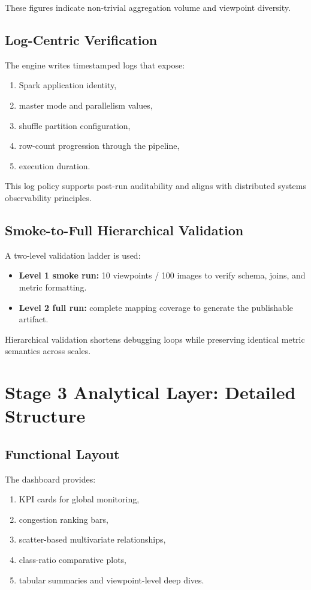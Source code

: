 \documentclass[journal,onecolumn]{IEEEtran}
\begin{document}
These figures indicate non-trivial aggregation volume and viewpoint diversity.

\subsection{Log-Centric Verification}
The engine writes timestamped logs that expose:
\begin{enumerate}
    \item Spark application identity,
    \item master mode and parallelism values,
    \item shuffle partition configuration,
    \item row-count progression through the pipeline,
    \item execution duration.
\end{enumerate}

This log policy supports post-run auditability and aligns with distributed systems observability principles.

\subsection{Smoke-to-Full Hierarchical Validation}
A two-level validation ladder is used:
\begin{itemize}
    \item \textbf{Level 1 smoke run:} 10 viewpoints / 100 images to verify schema, joins, and metric formatting.
    \item \textbf{Level 2 full run:} complete mapping coverage to generate the publishable artifact.
\end{itemize}

Hierarchical validation shortens debugging loops while preserving identical metric semantics across scales.

\section{Stage 3 Analytical Layer: Detailed Structure}

\subsection{Functional Layout}
The dashboard provides:
\begin{enumerate}
    \item KPI cards for global monitoring,
    \item congestion ranking bars,
    \item scatter-based multivariate relationships,
    \item class-ratio comparative plots,
    \item tabular summaries and viewpoint-level deep dives.
\end{enumerate}
\end{document}
